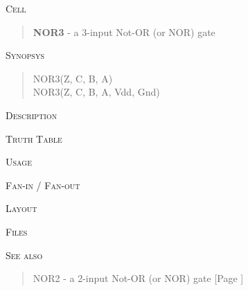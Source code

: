 
\label{NOR3}
\textsc{Cell}
\begin{quote}
    \textbf{NOR3} - a 3-input Not-OR (or NOR) gate
\end{quote}

\textsc{Synopsys}
\begin{quote}
    NOR3(Z, C, B, A) \\
    NOR3(Z, C, B, A, Vdd, Gnd)
\end{quote}

\textsc{Description}

%

\textsc{Truth Table}


\textsc{Usage}

\textsc{Fan-in / Fan-out}

\textsc{Layout}

\textsc{Files}

\textsc{See also}
\begin{quote}
    NOR2 - a 2-input Not-OR (or NOR) gate [Page \pageref{NOR2}]
\end{quote}
